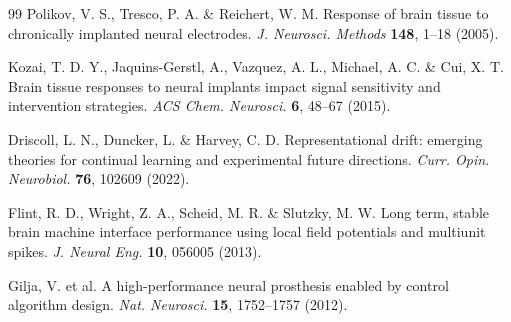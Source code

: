 \begin{thebibliography}{99}
 Polikov, V. S., Tresco, P. A. \& Reichert, W. M. Response of brain tissue to chronically implanted neural electrodes. \textit{J. Neurosci. Methods} \textbf{148}, 1--18 (2005).

 Kozai, T. D. Y., Jaquins-Gerstl, A., Vazquez, A. L., Michael, A. C. \& Cui, X. T. Brain tissue responses to neural implants impact signal sensitivity and intervention strategies. \textit{ACS Chem. Neurosci.} \textbf{6}, 48--67 (2015).

 Driscoll, L. N., Duncker, L. \& Harvey, C. D. Representational drift: emerging theories for continual learning and experimental future directions. \textit{Curr. Opin. Neurobiol.} \textbf{76}, 102609 (2022).

 Flint, R. D., Wright, Z. A., Scheid, M. R. \& Slutzky, M. W. Long term, stable brain machine interface performance using local field potentials and multiunit spikes. \textit{J. Neural Eng.} \textbf{10}, 056005 (2013).

 Gilja, V. et al. A high-performance neural prosthesis enabled by control algorithm design. \textit{Nat. Neurosci.} \textbf{15}, 1752--1757 (2012).

\end{thebibliography}

